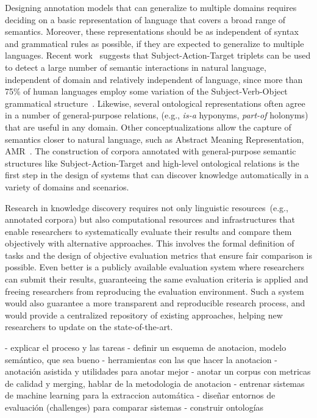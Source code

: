 Designing annotation models that can generalize to multiple domains requires deciding on a basic representation of language that covers a broad range of semantics.
Moreover, these representations should be as independent of syntax and grammatical rules as possible, if they are
expected to generalize to multiple languages.
Recent work~\cite{estevez2018gathering} suggests that Subject-Action-Target triplets can be used to detect a large number of semantic interactions in natural language, independent of domain and relatively independent of language, since
more than 75\% of human languages employ some variation of the Subject-Verb-Object grammatical structure~\cite{crystal2004cambridge}.
Likewise, several ontological representations often agree in a number of general-purpose relations, (e.g., \textit{is-a} hyponyms, \textit{part-of} holonyms) that are useful in any domain.
Other conceptualizations allow the capture of semantics closer to natural language, such as Abstract Meaning Representation, AMR~\cite{banarescu2013abstract}.
The construction of corpora annotated with general-purpose semantic structures like Subject-Action-Target and high-level ontological relations is the first step in the design of systems that can discover knowledge automatically in a variety of domains and scenarios.

Research in knowledge discovery requires not only linguistic resources~(e.g., annotated corpora) but also computational resources and infrastructures that enable researchers to systematically evaluate their results and compare them objectively with alternative approaches.
This involves the formal definition of tasks and the design of objective evaluation metrics that ensure fair comparison is possible.
Even better is a publicly available evaluation system where researchers can submit their results, guaranteeing the same evaluation criteria is applied and freeing researchers from reproducing the evaluation environment. Such a system would also guarantee a more transparent and reproducible research process, and would provide a centralized repository of existing approaches, helping new researchers to update on the state-of-the-art.


- explicar el proceso y las tareas
  - definir un esquema de anotacion, modelo semántico, que sea bueno
  - herramientas con las que hacer la anotacion
  - anotación asistida y utilidades para anotar mejor
  - anotar un corpus con metricas de calidad y merging, hablar de la metodologia de anotacion
  - entrenar sistemas de machine learning para la extraccion automática
  - diseñar entornos de evaluación (challenges) para comparar sistemas
  - construir ontologías


